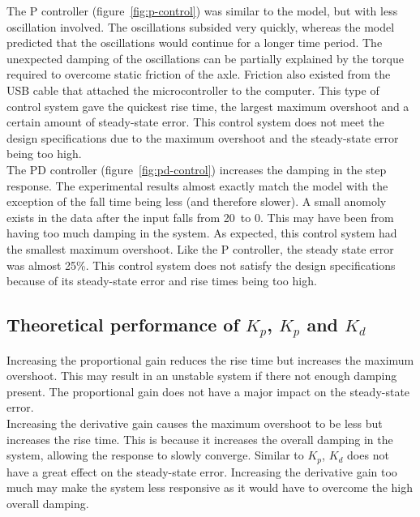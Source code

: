 \documentclass[12pt]{article} %
\begin{document}
\noindent The P controller (figure\ \ref{fig:p-control}) was similar to the model, but with less oscillation involved. The oscillations subsided very quickly, whereas the model predicted that the oscillations would continue for a longer time period. The unexpected damping of the oscillations can be partially explained by the torque required to overcome static friction of the axle. Friction also existed from the USB cable that attached the microcontroller to the computer. This type of control system gave the quickest rise time, the largest maximum overshoot and a certain amount of steady-state error. This control system does not meet the design specifications due to the maximum overshoot and the steady-state error being too high.
\\ 

\noindent The PD controller (figure\ \ref{fig:pd-control}) increases the damping in the step response. The experimental results almost exactly match the model with the exception of the fall time being less (and therefore slower). A small anomoly exists in the data after the input falls from 20\degree\ to 0\degree. This may have been from having too much damping in the system. As expected, this control system had the smallest maximum overshoot. Like the P controller, the steady state error was almost 25\%. This control system does not satisfy the design specifications because of its steady-state error and rise times being too high.

\subsection*{Theoretical performance of $K_p$, $K_p$ and $K_d$}

\noindent Increasing the proportional gain reduces the rise time but increases the maximum overshoot. This may result in an unstable system if there not enough damping present. The proportional gain does not have a major impact on the steady-state error.
\\

\noindent Increasing the derivative gain causes the maximum overshoot to be less but increases the rise time. This is because it increases the overall damping in the system, allowing the response to slowly converge. Similar to $K_p$, $K_d$ does not have a great effect on the steady-state error. Increasing the derivative gain too much may make the system less responsive as it would have to overcome the high overall damping.
\\
\end{document}
